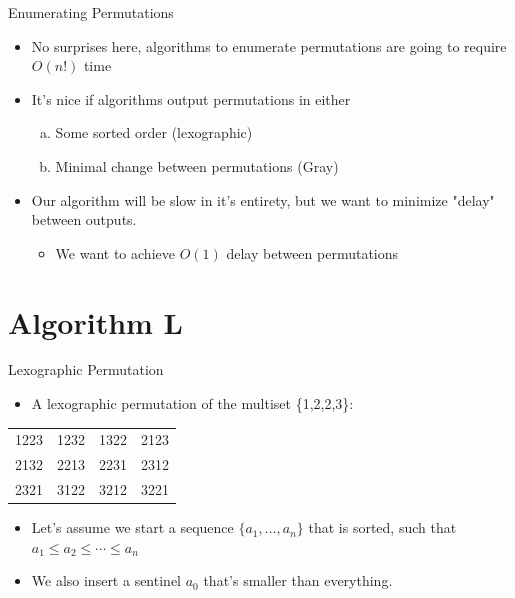 \documentclass[aspectratio=169]{beamer}
\begin{document}
\begin{frame}{Enumerating Permutations}
\begin{itemize}
    \item No surprises here, algorithms to enumerate permutations are going to require $O(n!)$ time \pause
    \item It's nice if algorithms output permutations in either 
    \begin{enumerate}[(a)]
        \item Some sorted order (lexographic)
        \item Minimal change between permutations (Gray) \pause
    \end{enumerate}
    \item Our algorithm will be slow in it's entirety, but we want to minimize "delay" between outputs. 
    \begin{itemize}
        \item We want to achieve $O(1)$ delay between permutations
    \end{itemize}
\end{itemize}
\end{frame}

\section{Algorithm L}
\frame{\sectionpage}

\begin{frame}{Lexographic Permutation}
\begin{itemize}
    \item A lexographic permutation of the multiset \{1,2,2,3\}:
\end{itemize}
\begin{table}[]
\begin{tabular}{llll}
1223 & 1232 & 1322 & 2123 \\
2132 & 2213 & 2231 & 2312 \\
2321 & 3122 & 3212 & 3221
\end{tabular}
\end{table} \pause
\begin{itemize}
    \item Let's assume we start a sequence $\{a_1, \dots, a_n\}$ that is sorted, such that $a_1 \leq a_2 \leq \cdots \leq a_n$
    \item We also insert a sentinel $a_0$ that's smaller than everything.
\end{itemize}
\end{frame}
\end{document}
